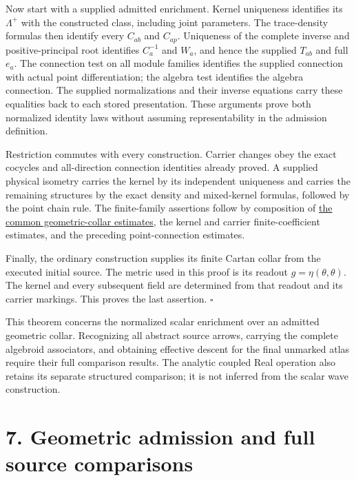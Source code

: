 \documentclass[
  english,
  11pt,
  reqno]{amsart}
\begin{document}
Now start with a supplied admitted enrichment. Kernel uniqueness
identifies its \(\Lambda^+\) with the constructed class, including joint
parameters. The trace-density formulas then identify every \(C_{ab}\)
and \(C_{ap}\). Uniqueness of the complete inverse and
positive-principal root identifies \(C_a^{-1}\) and \(W_a\), and hence
the supplied \(T_{ab}\) and full \(e_a\). The connection test on all
module families identifies the supplied connection with actual point
differentiation; the algebra test identifies the algebra connection. The
supplied normalizations and their inverse equations carry these
equalities back to each stored presentation. These arguments prove both
normalized identity laws without assuming representability in the
admission definition.

Restriction commutes with every construction. Carrier changes obey the
exact cocycles and all-direction connection identities already proved. A
supplied physical isometry carries the kernel by its independent
uniqueness and carries the remaining structures by the exact density and
mixed-kernel formulas, followed by the point chain rule. The
finite-family assertions follow by composition of
\hyperref[thm:online-common-collar-finite-families]{the common
geometric-collar estimates}, the kernel and carrier finite-coefficient
estimates, and the preceding point-connection estimates.

Finally, the ordinary construction supplies its finite Cartan collar
from the executed initial source. The metric used in this proof is its
readout \(g=\eta(\theta,\theta)\). The kernel and every subsequent field
are determined from that readout and its carrier markings. This proves
the last assertion. \hfill\(\square\)

This theorem concerns the normalized scalar enrichment over an admitted
geometric collar. Recognizing all abstract source arrows, carrying the
complete algebroid associators, and obtaining effective descent for the
final unmarked atlas require their full comparison results. The analytic
coupled Real operation also retains its separate structured comparison;
it is not inferred from the scalar wave construction.

\section{7. Geometric admission and full source
comparisons}\label{geometric-admission-and-full-source-comparisons}\label{sec:online-complete-source-comparisons}
\end{document}
